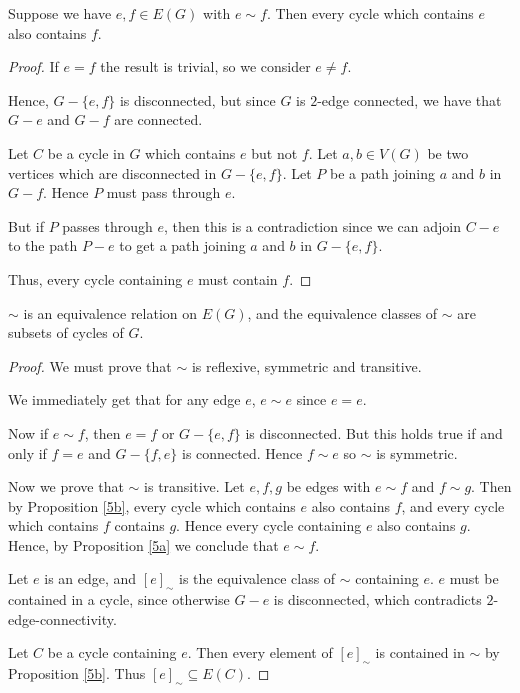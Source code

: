 \documentclass{unswmaths}
\begin{document}
\begin{proposition}
\label{5b}
Suppose we have $e,f \in E(G)$ with $e \sim f$. Then every cycle which contains $e$
also contains $f$.
\end{proposition}
\begin{proof}
    If $e = f$ the result is trivial, so we consider $e \neq f$. 
    
    Hence, $G - \{e,f\}$ is disconnected, but since $G$ is $2$-edge connected,
    we have that $G - e$ and $G-f$ are connected. 
    
    Let $C$ be a cycle in $G$ which contains $e$ but not $f$. Let $a,b \in V(G)$
    be two vertices which are disconnected in $G-\{e,f\}$. Let $P$ be a path joining
    $a$ and $b$ in $G-f$. Hence $P$ must pass through $e$.
    
    But if $P$ passes through $e$, then this is a contradiction since we can adjoin $C-e$
    to the path $P-e$ to get a path joining $a$ and $b$ in $G-\{e,f\}$. 
    
    Thus, every cycle containing $e$ must contain $f$.
\end{proof}

\begin{proposition}
\label{5c}
    $\sim$ is an equivalence relation on $E(G)$, and the equivalence classes
    of $\sim$ are subsets of cycles of $G$.
\end{proposition}
\begin{proof}
    We must prove that $\sim$ is reflexive, symmetric and transitive.
    
    We immediately get that for any edge $e$, $e \sim e$ since $e = e$.
    
    Now if $e \sim f$, then $e = f$ or $G - \{e,f\}$ is disconnected. 
    But this holds true if and only if $f = e$ and $G - \{f,e\}$ is connected.
    Hence $f \sim e$ so $\sim$ is symmetric.
    
    Now we prove that $\sim$ is transitive. Let $e,f,g$ be edges with $e \sim f$
    and $f \sim g$. Then by Proposition \ref{5b}, every cycle which contains $e$
    also contains $f$, and every cycle which contains $f$ contains $g$.
    Hence every cycle containing $e$ also contains $g$. Hence, by Proposition \ref{5a}
    we conclude that $e \sim f$.    
    
    Let $e$ is an edge, and $[e]_\sim$ is the equivalence class
    of $\sim$ containing $e$. 
    $e$ must be contained in a cycle, since otherwise $G-e$ is disconnected, which
    contradicts $2$-edge-connectivity.
    
    Let $C$ be a cycle containing $e$. Then every 
    element of $[e]_\sim$ is contained in $\sim$ by Proposition \ref{5b}. 
    Thus $[e]_\sim \subseteq E(C)$.
\end{proof}
\end{document}
